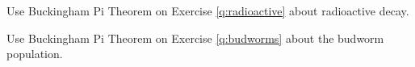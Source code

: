 \begin{slide}

\question

\begin{parts}
	\item Use Buckingham Pi Theorem on Exercise \ref{q:radioactive} about radioactive decay.
	\item Use Buckingham Pi Theorem on Exercise \ref{q:budworms} about the budworm population.
\end{parts}
	
\end{slide}





%
%
%
%
